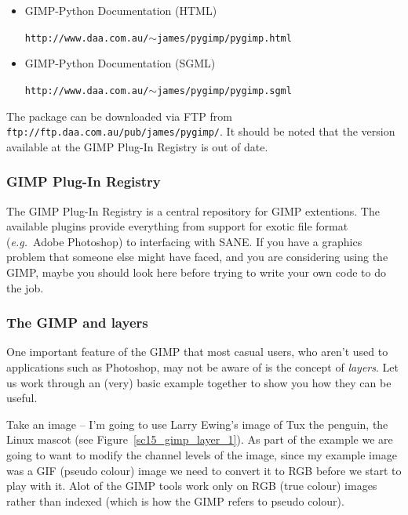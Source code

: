 \documentclass[twoside,11pt]{article}
\newcommand{\htmladdnormallink}[2]{#1}
\newcommand{\htmlref}[2]{#1}
\begin{document}
\begin{itemize}
\item {GIMP-Python Documentation (HTML)}\\
\begin{small}\htmladdnormallink{{\tt http://www.daa.com.au/$\sim$james/pygimp/pygimp.html}}{http://www.daa.com.au/~james/pygimp/pygimp.html}\end{small}
\item {GIMP-Python Documentation (SGML)}\\
\begin{small}\htmladdnormallink{{\tt http://www.daa.com.au/$\sim$james/pygimp/pygimp.sgml}}{http://www.daa.com.au/~james/pygimp/pygimp.sgml}\end{small}
\end{itemize}

The package can be downloaded via FTP from \htmladdnormallink{{\tt ftp://ftp.daa.com.au/pub/james/pygimp/}}{ftp://ftp.daa.com.au/pub/james/pygimp/}. It should be noted that the version available at the GIMP Plug-In Registry is out of date.

\subsubsection{GIMP Plug-In Registry}

The GIMP \htmladdnormallink{Plug-In Registry}{http://registry.gimp.org/} is a central repository for GIMP extentions. The available plugins provide everything from support for exotic file format ({\em e.g.\ }Adobe Photoshop) to interfacing with \htmlref{SANE}{sc15_scanners}. If you have a graphics problem that someone else might have faced, and you are considering using the GIMP, maybe you should look here before trying to write your own code to do the job.

\subsubsection{The GIMP and layers}

One important feature of the GIMP that most casual users, who aren't used to applications such as Photoshop, may not be aware of is the concept of {\em layers}. Let us work through an (very) basic example together to show you how they can be useful.

Take an image -- I'm going to use Larry Ewing's image of \htmladdnormallink{Tux the penguin}{http://www.woodsoup.org/projs/tux_aqfh/doc/index.html}, the Linux mascot (see Figure~\ref{sc15_gimp_layer_1}). As part of the example we are going to want to modify the channel levels of the image, since my example image was a GIF (pseudo colour) image we need to convert it to RGB before we start to play with it. Alot of the GIMP tools work only on RGB (true colour) images rather than indexed (which is how the GIMP refers to \htmlref{pseudo colour}{sc15_pseudo}). 
\end{document}
